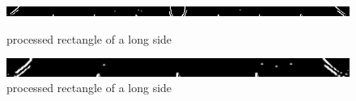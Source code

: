 \begin{figure}
    \centering
    \includegraphics[width=1.0\textwidth]{./imgs/sobel_long_side.png}
    \caption{processed rectangle of a long side}\par
    \vspace{10pt}
    \includegraphics[width=1.0\textwidth]{./imgs/sobel_short_side.png}
    \caption{processed rectangle of a long side}
\end{figure}
